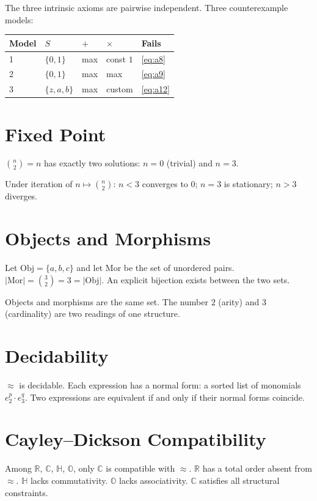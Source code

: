 The three intrinsic axioms are pairwise independent.
Three counterexample models:
\begin{center}
\begin{tabular}{lllll}
\hline
Model & $S$ & $+$ & $\times$ & Fails \\
\hline
1 & $\{0,1\}$ & max & const $1$ & \eqref{eq:a8} \\
2 & $\{0,1\}$ & max & max & \eqref{eq:a9} \\
3 & $\{z,a,b\}$ & max & custom & \eqref{eq:a12} \\
\hline
\end{tabular}
\end{center}

\section{Fixed Point}

$\binom{n}{2} = n$ has exactly two solutions:
$n = 0$ (trivial) and $n = 3$.

Under iteration of $n \mapsto \binom{n}{2}$:
$n < 3$ converges to $0$;
$n = 3$ is stationary;
$n > 3$ diverges.

\section{Objects and Morphisms}

Let $\mathrm{Obj} = \{a, b, c\}$ and let
$\mathrm{Mor}$ be the set of unordered pairs.
$|\mathrm{Mor}| = \binom{3}{2} = 3 = |\mathrm{Obj}|$.
An explicit bijection exists between the two sets.

Objects and morphisms are the same set.
The number $2$ (arity) and $3$ (cardinality)
are two readings of one structure.

\section{Decidability}

$\approx$ is decidable.
Each expression has a normal form:
a sorted list of monomials $e_2^p \cdot e_3^q$.
Two expressions are equivalent if and only if
their normal forms coincide.

\section{Cayley--Dickson Compatibility}

Among $\mathbb{R}$, $\mathbb{C}$, $\mathbb{H}$,
$\mathbb{O}$, only $\mathbb{C}$ is compatible
with $\approx$.
$\mathbb{R}$ has a total order absent from $\approx$.
$\mathbb{H}$ lacks commutativity.
$\mathbb{O}$ lacks associativity.
$\mathbb{C}$ satisfies all structural constraints.

